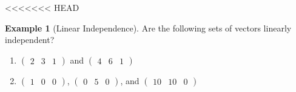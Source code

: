 \documentclass[]{book}
\providecommand{\tightlist}{%
  \setlength{\itemsep}{0pt}\setlength{\parskip}{0pt}}
\theoremstyle{definition}
\theoremstyle{definition}
\newtheorem{example}{Example}[chapter]
\theoremstyle{definition}
\theoremstyle{remark}
\begin{document}
<<<<<<< HEAD
\begin{example}[Linear Independence]
\protect\hypertarget{exm:linearindep}{}{\label{exm:linearindep} {} }
Are the following sets of vectors linearly independent?

\begin{enumerate}
\def\labelenumi{\arabic{enumi}.}
\tightlist
\item
  \(\begin{pmatrix}2 & 3 & 1 \end{pmatrix}\) and \(\begin{pmatrix}4 & 6 & 1 \end{pmatrix}\)
\item
  \(\begin{pmatrix}1 & 0 & 0 \end{pmatrix}\), \(\begin{pmatrix}0 & 5 & 0 \end{pmatrix}\), and \(\begin{pmatrix}10 & 10 & 0 \end{pmatrix}\)
\end{enumerate}
\end{example}
\end{document}
